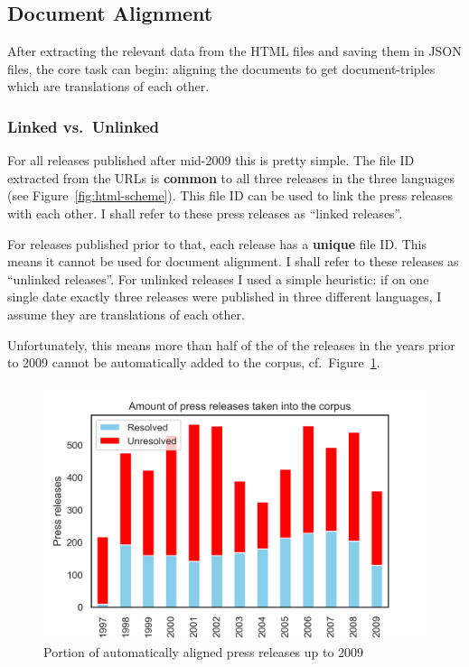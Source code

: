 \subsection{Document Alignment}
After extracting the relevant data from the HTML files and saving them in JSON files, the core task can begin: aligning the documents to get document-triples which are translations of each other.

\subsubsection{Linked vs.~Unlinked}
\label{sec:linked-unlinked}
For all releases published after mid-2009 this is pretty simple. 
The file ID extracted from the URLs is \textbf{common} to all three releases in the three languages (see Figure~\ref{fig:html-scheme}). 
This file ID can be used to link the press releases with each other. 
I shall refer to these press releases as \enquote{linked releases}.

For releases published prior to that, each release has a \textbf{unique} file ID. 
This means it cannot be used for document alignment. 
I shall refer to these releases as \enquote{unlinked releases}.
For unlinked releases I used a simple heuristic: if on one single date exactly three releases were published in three different languages, I assume they are translations of each other. 

Unfortunately, this means more than half of the of the releases in the years prior to 2009 cannot be automatically added to the corpus, cf.~Figure~\ref{fig:linked-unlinked}.

\begin{figure}[h]
	\centering
	\includegraphics{graphics/linked-unlinked.png}
	\caption{Portion of automatically aligned press releases up to 2009}
	\label{fig:linked-unlinked}
\end{figure}

